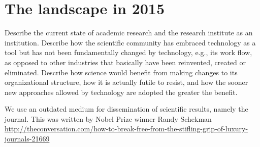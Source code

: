 \section{The landscape in 2015}
Describe the current state of academic research and the research institute as an institution. Describe how the scientific community has embraced technology as a tool but has not been fundamentally changed by technology, e.g., its work flow, as opposed to other industries that basically have been reinvented, created or eliminated. Describe how science would benefit from making changes to its organizational structure, how it is actually futile to resist, and how the sooner new approaches allowed by technology are adopted the greater the benefit.

We use an outdated medium for dissemination of scientific results, namely the journal. This was written by Nobel Prize winner Randy Schekman \url{http://theconversation.com/how-to-break-free-from-the-stifling-grip-of-luxury-journals-21669} 